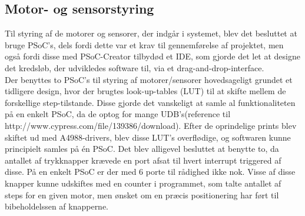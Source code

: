 \subsection{Motor- og sensorstyring}
Til styring af de motorer og sensorer, der indgår i systemet, blev det besluttet at bruge PSoC's, dels fordi dette var et krav til gennemførelse af projektet, men også fordi disse med PSoC-Creator tilbydød et IDE, som gjorde det let at designe det kredsløb, der udvikledes software til, via et drag-and-drop-interface. \\

Der benyttes to PSoC's til styring af motorer/sensorer hovedsageligt grundet et tidligere design, hvor der brugtes look-up-tables (LUT) til at skifte mellem de forskellige step-tilstande. Disse gjorde det vanskeligt at samle al funktionaliteten på en enkelt PSoC, da de optog for mange UDB's(reference til http://www.cypress.com/file/139386/download). Efter de oprindelige prints blev skiftet ud med A4988-drivers, blev disse LUT's overflødige, og softwaren kunne principielt samles på én PSoC. Det blev alligevel besluttet at benytte to, da antallet af trykknapper krævede en port afsat til hvert interrupt triggered af disse. På en enkelt PSoC er der med 6 porte til rådighed ikke nok. Visse af disse knapper kunne udskiftes med en counter i programmet, som talte antallet af steps for en given motor, men ønsket om en præcis positionering har ført til bibeholdelssen af knapperne.